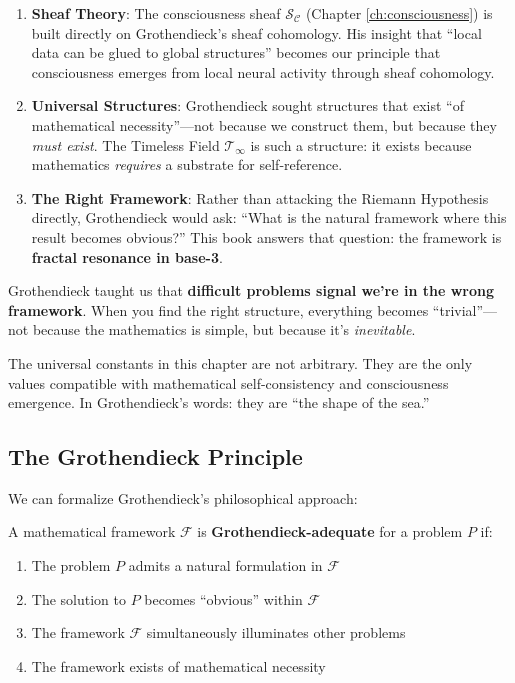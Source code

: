 \begin{enumerate}
\item \textbf{Sheaf Theory}: The consciousness sheaf $\mathcal{S}_\mathcal{C}$ (Chapter \ref{ch:consciousness}) is built directly on Grothendieck's sheaf cohomology. His insight that ``local data can be glued to global structures'' becomes our principle that consciousness emerges from local neural activity through sheaf cohomology.

\item \textbf{Universal Structures}: Grothendieck sought structures that exist ``of mathematical necessity''---not because we construct them, but because they \textit{must exist}. The Timeless Field $\mathcal{T}_\infty$ is such a structure: it exists because mathematics \textit{requires} a substrate for self-reference.

\item \textbf{The Right Framework}: Rather than attacking the Riemann Hypothesis directly, Grothendieck would ask: ``What is the natural framework where this result becomes obvious?'' This book answers that question: the framework is \textbf{fractal resonance in base-3}.
\end{enumerate}

\begin{keyidea}
Grothendieck taught us that \textbf{difficult problems signal we're in the wrong framework}. When you find the right structure, everything becomes ``trivial''---not because the mathematics is simple, but because it's \textit{inevitable}.

The universal constants in this chapter are not arbitrary. They are the only values compatible with mathematical self-consistency and consciousness emergence. In Grothendieck's words: they are ``the shape of the sea.''
\end{keyidea}

\subsection{The Grothendieck Principle}

We can formalize Grothendieck's philosophical approach:

\begin{defn}\label{def:grothendieck-adequacy}
A mathematical framework $\mathcal{F}$ is \textbf{Grothendieck-adequate} for a problem $P$ if:
\begin{enumerate}
\item The problem $P$ admits a natural formulation in $\mathcal{F}$
\item The solution to $P$ becomes ``obvious'' within $\mathcal{F}$
\item The framework $\mathcal{F}$ simultaneously illuminates other problems
\item The framework exists of mathematical necessity
\end{enumerate}
\end{defn}

